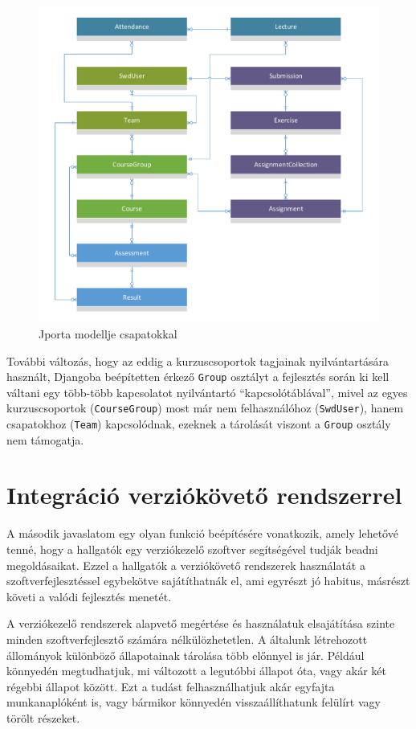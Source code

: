 \begin{figure}[h]
    \centering
    \includegraphics[width=\textwidth]{figures/teams-after}
    \caption{Jporta modellje csapatokkal}
    \label{figure:teams-after}
\end{figure}

További változás, hogy az eddig a kurzuscsoportok tagjainak nyilvántartására használt, Djangoba beépítetten érkező \texttt{Group} osztályt a fejlesztés során ki kell váltani egy több-több kapcsolatot nyilvántartó ``kapcsolótáblával'', mivel az egyes kurzuscsoportok (\texttt{CourseGroup}) most már nem felhasználóhoz (\texttt{SwdUser}), hanem csapatokhoz (\texttt{Team}) kapcsolódnak, ezeknek a tárolását viszont a \texttt{Group} osztály nem támogatja.

\section{Integráció verziókövető rendszerrel}
A második javaslatom egy olyan funkció beépítésére vonatkozik, amely lehetővé tenné, hogy a hallgatók egy verziókezelő szoftver segítségével tudják beadni megoldásaikat.
Ezzel a hallgatók a verziókövető rendszerek használatát a szoftverfejlesztéssel egybekötve sajátíthatnák el, ami egyrészt jó habitus, másrészt követi a valódi fejlesztés menetét.

A verziókezelő rendszerek alapvető megértése és használatuk elsajátítása szinte minden szoftverfejlesztő számára nélkülözhetetlen.
A általunk létrehozott állományok különböző állapotainak tárolása több előnnyel is jár.
Például könnyedén megtudhatjuk, mi változott a legutóbbi állapot óta, vagy akár két régebbi állapot között.
Ezt a tudást felhasználhatjuk akár egyfajta munkanaplóként is, vagy bármikor könnyedén visszaállíthatunk felülírt vagy törölt részeket.

